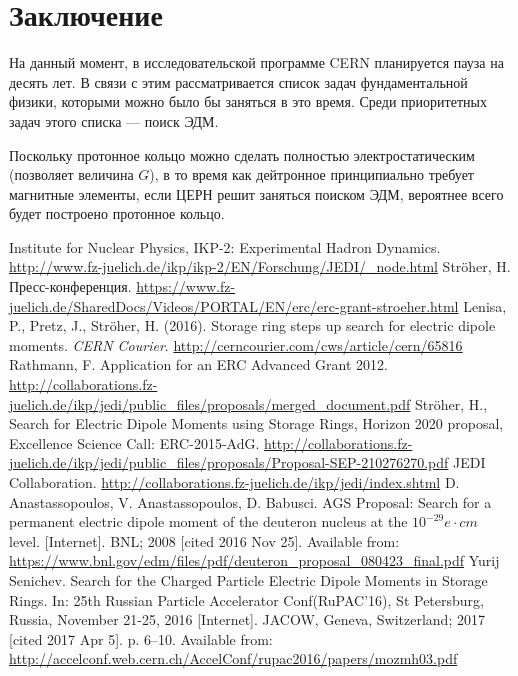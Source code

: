 \documentclass{extarticle}
\begin{document}
\section*{Заключение}
На данный момент, в исследовательской программе CERN планируется пауза на десять лет. В связи с этим рассматривается список задач фундаментальной физики, которыми можно было бы заняться в это время. Среди приоритетных задач этого списка --- поиск ЭДМ. 

Поскольку протонное кольцо можно сделать полностью электростатическим (позволяет величина $G$), в то время как дейтронное принципиально требует магнитные элементы, если ЦЕРН решит заняться поиском ЭДМ, вероятнее всего будет построено протонное кольцо.
\begin{thebibliography}{0}
	Institute for Nuclear Physics, IKP-2: Experimental Hadron Dynamics. \url{http://www.fz-juelich.de/ikp/ikp-2/EN/Forschung/JEDI/_node.html}
	Str\"oher, H. Пресс-конференция. \url{https://www.fz-juelich.de/SharedDocs/Videos/PORTAL/EN/erc/erc-grant-stroeher.html}
	Lenisa, P., Pretz, J., Str\"oher, H. (2016). Storage ring steps up search for electric dipole moments. \textit{CERN Courier}. \url{http://cerncourier.com/cws/article/cern/65816}
	Rathmann, F. Application for an ERC Advanced Grant 2012. \url{http://collaborations.fz-juelich.de/ikp/jedi/public_files/proposals/merged_document.pdf}
	Str\"oher, H., Search for Electric Dipole Moments using Storage Rings, Horizon 2020 proposal, Excellence Science Call: ERC-2015-AdG. \url{http://collaborations.fz-juelich.de/ikp/jedi/public_files/proposals/Proposal-SEP-210276270.pdf}
	JEDI Collaboration. \url{http://collaborations.fz-juelich.de/ikp/jedi/index.shtml}
	D. Anastassopoulos, V. Anastassopoulos, D. Babusci. AGS Proposal: Search for a permanent electric dipole moment of the deuteron nucleus at the $10^{-29} e\cdot cm$ level. [Internet]. BNL; 2008 [cited 2016 Nov 25]. Available from: \url{https://www.bnl.gov/edm/files/pdf/deuteron_proposal_080423_final.pdf}
	Yurij Senichev. Search for the Charged Particle Electric Dipole Moments in Storage Rings. In: 25th Russian Particle Accelerator Conf(RuPAC’16), St Petersburg, Russia, November 21-25, 2016 [Internet]. JACOW, Geneva, Switzerland; 2017 [cited 2017 Apr 5]. p. 6–10. Available from: \url{http://accelconf.web.cern.ch/AccelConf/rupac2016/papers/mozmh03.pdf}
	
\end{thebibliography}
\end{document}
